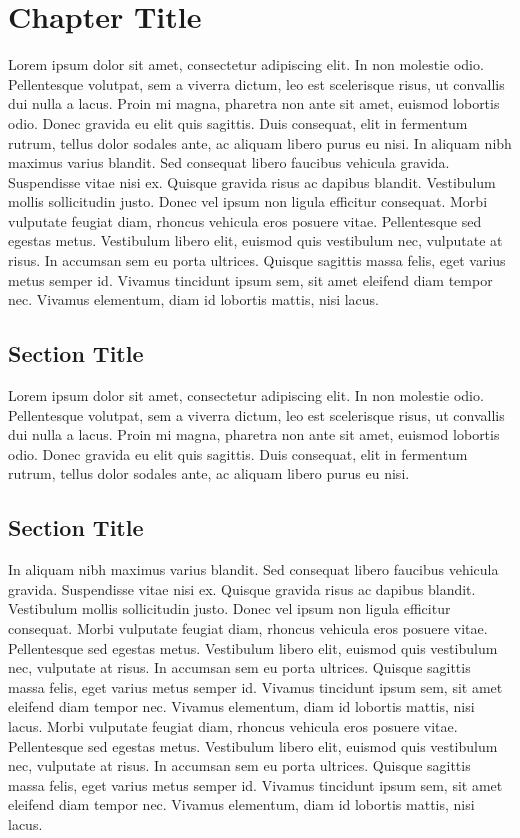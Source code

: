 \documentclass[12pt]{report}
\begin{document}
\chapter{Chapter Title}

Lorem ipsum dolor sit amet, consectetur adipiscing elit. In non molestie odio. Pellentesque volutpat, sem a viverra dictum, leo est scelerisque risus, ut convallis dui nulla a lacus. Proin mi magna, pharetra non ante sit amet, euismod lobortis odio. Donec gravida eu elit quis sagittis. Duis consequat, elit in fermentum rutrum, tellus dolor sodales ante, ac aliquam libero purus eu nisi. In aliquam nibh maximus varius blandit. Sed consequat libero faucibus vehicula gravida. Suspendisse vitae nisi ex. Quisque gravida risus ac dapibus blandit. Vestibulum mollis sollicitudin justo. Donec vel ipsum non ligula efficitur consequat. Morbi vulputate feugiat diam, rhoncus vehicula eros posuere vitae. Pellentesque sed egestas metus. Vestibulum libero elit, euismod quis vestibulum nec, vulputate at risus. In accumsan sem eu porta ultrices. Quisque sagittis massa felis, eget varius metus semper id. Vivamus tincidunt ipsum sem, sit amet eleifend diam tempor nec. Vivamus elementum, diam id lobortis mattis, nisi lacus.

\section{Section Title}
Lorem ipsum dolor sit amet, consectetur adipiscing elit. In non molestie odio. Pellentesque volutpat, sem a viverra dictum, leo est scelerisque risus, ut convallis dui nulla a lacus. Proin mi magna, pharetra non ante sit amet, euismod lobortis odio. Donec gravida eu elit quis sagittis. Duis consequat, elit in fermentum rutrum, tellus dolor sodales ante, ac aliquam libero purus eu nisi. 


\section{Section Title}
In aliquam nibh maximus varius blandit. Sed consequat libero faucibus vehicula gravida. Suspendisse vitae nisi ex. Quisque gravida risus ac dapibus blandit. Vestibulum mollis sollicitudin justo. Donec vel ipsum non ligula efficitur consequat. Morbi vulputate feugiat diam, rhoncus vehicula eros posuere vitae. Pellentesque sed egestas metus. Vestibulum libero elit, euismod quis vestibulum nec, vulputate at risus. In accumsan sem eu porta ultrices. Quisque sagittis massa felis, eget varius metus semper id. Vivamus tincidunt ipsum sem, sit amet eleifend diam tempor nec. Vivamus elementum, diam id lobortis mattis, nisi lacus. Morbi vulputate feugiat diam, rhoncus vehicula eros posuere vitae. Pellentesque sed egestas metus. Vestibulum libero elit, euismod quis vestibulum nec, vulputate at risus. In accumsan sem eu porta ultrices. Quisque sagittis massa felis, eget varius metus semper id. Vivamus tincidunt ipsum sem, sit amet eleifend diam tempor nec. Vivamus elementum, diam id lobortis mattis, nisi lacus.
\end{document}

